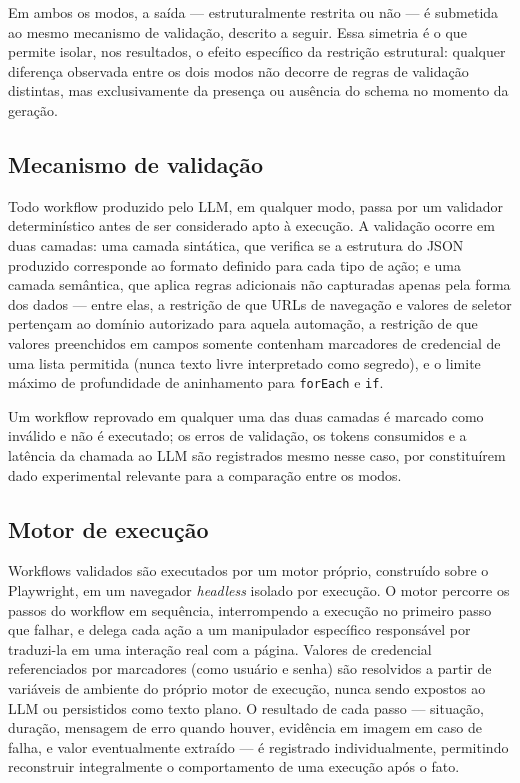 \documentclass[
	article,
	12pt,
	oneside,
	a4paper,
	section=TITLE,
	english,
	brazil,
	sumario=tradicional
	]{abntex2}
\begin{document}
Em ambos os modos, a saída --- estruturalmente restrita ou não --- é
submetida ao mesmo mecanismo de validação, descrito a seguir. Essa
simetria é o que permite isolar, nos resultados, o efeito específico da
restrição estrutural: qualquer diferença observada entre os dois modos não
decorre de regras de validação distintas, mas exclusivamente da presença
ou ausência do schema no momento da geração.

\subsection{Mecanismo de validação}

Todo workflow produzido pelo LLM, em qualquer modo, passa por um
validador determinístico antes de ser considerado apto à execução. A
validação ocorre em duas camadas: uma camada sintática, que verifica se a
estrutura do JSON produzido corresponde ao formato definido para cada tipo
de ação; e uma camada semântica, que aplica regras adicionais não
capturadas apenas pela forma dos dados --- entre elas, a restrição de que
URLs de navegação e valores de seletor pertençam ao domínio autorizado
para aquela automação, a restrição de que valores preenchidos em campos
somente contenham marcadores de credencial de uma lista permitida (nunca
texto livre interpretado como segredo), e o limite máximo de profundidade
de aninhamento para \texttt{forEach} e \texttt{if}.

Um workflow reprovado em qualquer uma das duas camadas é marcado como
inválido e não é executado; os erros de validação, os tokens consumidos e
a latência da chamada ao LLM são registrados mesmo nesse caso, por
constituírem dado experimental relevante para a comparação entre os
modos.

\subsection{Motor de execução}

Workflows validados são executados por um motor próprio, construído sobre
o Playwright, em um navegador \textit{headless} isolado por execução. O
motor percorre os passos do workflow em sequência, interrompendo a
execução no primeiro passo que falhar, e delega cada ação a um manipulador
específico responsável por traduzi-la em uma interação real com a página.
Valores de credencial referenciados por marcadores (como usuário e senha)
são resolvidos a partir de variáveis de ambiente do próprio motor de
execução, nunca sendo expostos ao LLM ou persistidos como texto plano. O
resultado de cada passo --- situação, duração, mensagem de erro quando
houver, evidência em imagem em caso de falha, e valor eventualmente
extraído --- é registrado individualmente, permitindo reconstruir
integralmente o comportamento de uma execução após o fato.
\end{document}
